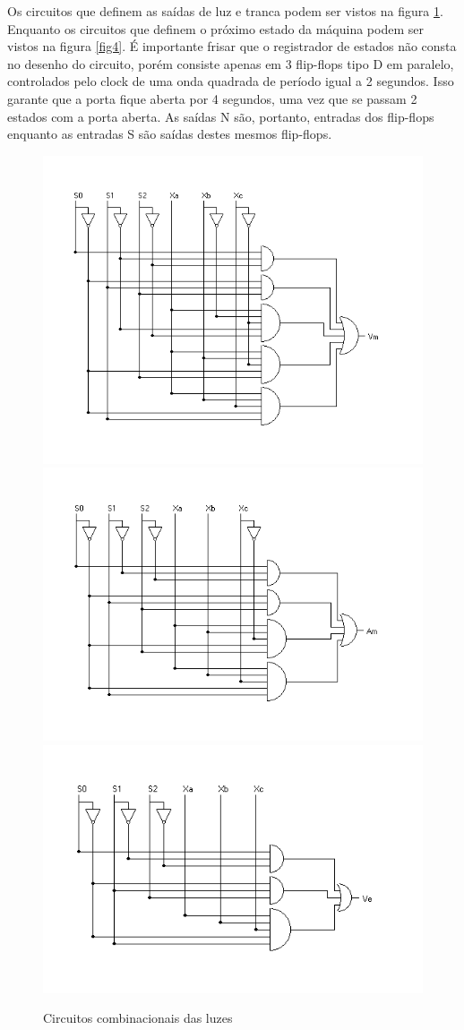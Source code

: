 \documentclass[12pt,a4paper]{article}
\begin{document}
Os circuitos que definem as saídas de luz e tranca podem ser vistos na figura \ref{fig3}. Enquanto os circuitos que definem o próximo estado da máquina podem ser vistos na figura \ref{fig4}. É importante frisar que o registrador de estados não consta no desenho do circuito, porém consiste apenas em 3 flip-flops tipo D em paralelo, controlados pelo clock de uma onda quadrada de período igual a 2 segundos. Isso garante que a porta fique aberta por 4 segundos, uma vez que se passam 2 estados com a porta aberta. As saídas N são, portanto, entradas dos flip-flops enquanto as entradas S são saídas destes mesmos flip-flops.

\begin{figure}[!h]
\begin{center}
\includegraphics[width=.65\textwidth]{vm.png}
\includegraphics[width=.65\textwidth]{am.png}
\includegraphics[width=.65\textwidth]{ve.png}
\end{center}
\caption{Circuitos combinacionais das luzes}
\label{fig3}
\end{figure}
\end{document}
